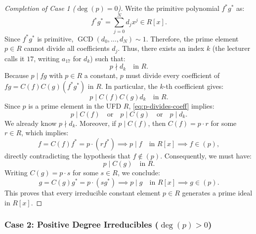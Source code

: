 \begin{proofWrapper}
\begin{content}
\begin{proof}[Completion of Case 1 ($\deg(p) = 0$)]
Write the primitive polynomial $f^* g^*$ as:
\[
f^* g^* = \sum_{j=0}^N d_j x^j \in R[x].
\]
Since $f^* g^*$ is primitive, $\operatorname{GCD}(d_0, \dots, d_N) \sim 1$. Therefore, the prime element $p \in R$ cannot divide all coefficients $d_j$. Thus, there exists an index $k$ (the lecturer calls it $17$, writing $a_{17}$ for $d_k$) such that:
\[
p \nmid d_k \quad \text{in } R.
\]
Because $p \mid fg$ with $p \in R$ a constant, $p$ must divide every coefficient of $fg = C(f) C(g) (f^* g^*)$ in $R$. In particular, the $k$-th coefficient gives:
\begin{equation}\label{eq:p-divides-coeff}
p \mid C(f) C(g) d_k \quad \text{in } R.
\end{equation}
Since $p$ is a prime element in the UFD $R$, \eqref{eq:p-divides-coeff} implies:
\[
p \mid C(f) \quad \text{or} \quad p \mid C(g) \quad \text{or} \quad p \mid d_k.
\]
We already know $p \nmid d_k$. Moreover, if $p \mid C(f)$, then $C(f) = p \cdot r$ for some $r \in R$, which implies:
\[
f = C(f) f^* = p \cdot (r f^*) \implies p \mid f \quad \text{in } R[x] \implies f \in (p),
\]
directly contradicting the hypothesis that $f \notin (p)$.
Consequently, we must have:
\[
p \mid C(g) \quad \text{in } R.
\]
Writing $C(g) = p \cdot s$ for some $s \in R$, we conclude:
\[
g = C(g) g^* = p \cdot (s g^*) \implies p \mid g \quad \text{in } R[x] \implies g \in (p).
\]
This proves that every irreducible constant element $p \in R$ generates a prime ideal in $R[x]$.
\end{proof}
\end{content}

\begin{hidden}
\end{hidden}

\subsubsection{Case 2: Positive Degree Irreducibles (\texorpdfstring{$\deg(p) > 0$}{deg(p) > 0})}


\end{proofWrapper}
